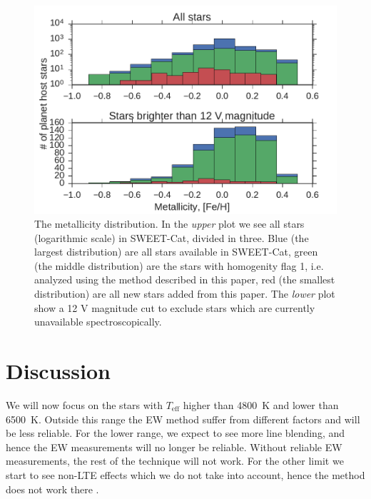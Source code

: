 \documentclass{aa}
\begin{document}
\begin{figure}[tpb]
    \centering
    \includegraphics[width=1.0\linewidth,natwidth=450,natheight=300]{figures/metallicityDistribution.pdf}
    \caption{The metallicity distribution. In the \emph{upper} plot we see all
             stars (logarithmic scale) in SWEET-Cat, divided in three. Blue
             (the largest distribution) are all stars available in SWEET-Cat,
             green (the middle distribution) are the stars with homogenity flag
             1, i.e. analyzed using the method described in this paper, red
             (the smallest distribution) are all new stars added from this
             paper. The \emph{lower} plot show a 12 V magnitude cut to exclude
             stars which are currently unavailable spectroscopically.}
    \label{fig:distribution}
\end{figure}



\section{Discussion}
\label{sec:Discussion}
We will now focus on the stars with $T_\mathrm{eff}$ higher than \SI{4800}{K}
and lower than \SI{6500}{K}. Outside this range the EW method suffer from
different factors and will be less reliable. For the lower range, we expect to
see more line blending, and hence the EW measurements will no longer be
reliable. Without reliable EW measurements, the rest of the technique will not
work. For the other limit we start to see non-LTE effects which we do not take
into account, hence the method does not work there \citep{Gray2006}.
\end{document}
